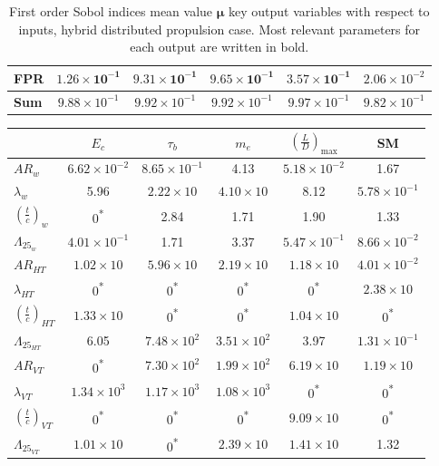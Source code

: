 \begin{table}[!h]
\begin{tabular}{l c c c c c}
		FPR  & $\mathbf{1.26\times10^{-1}}$ & $\mathbf{9.31\times10^{-1}}$ & $\mathbf{9.65\times10^{-1}}$ & $\mathbf{3.57\times10^{-1}}$ & $2.06\times10^{-2}$ \\
		\hline
		\textbf{Sum} & $9.88\times10^{-1}$ & $9.92\times10^{-1}$ & $9.92\times10^{-1}$ & $9.97\times10^{-1}$ & $9.82\times10^{-1}$ \\
		\hline
	\end{tabular}
	\caption{First order Sobol indices mean value $\mathbf{\mu}$ key output variables with respect to inputs, hybrid distributed propulsion case. 
		Most relevant parameters for each output are written in bold.}
	\label{tab:hybrid_dep_sens_an_geom_sobol}
\end{table}
\begin{table}[!h]
	\centering
	\begin{tabular}{l c c c c c}
		\hline
		& $E_{c}$ & $\tau_{b}$ & $m_e$ & $\left(\frac{L}{D}\right)_{\max}$ & SM \\
		\hline
		$AR_w$ & $6.62\times10^{-2}$ & $8.65\times10^{-1}$ & 4.13 & $5.18\times10^{-2}$ & 1.67 \\
		$\lambda_{w}$ & 5.96 & $2.22\times10$ & $4.10\times10$ & 8.12 & $5.78\times10^{-1}$ \\
		$\left(\frac{t}{c}\right)_{w}$ & 0\textsuperscript{*} & 2.84 & 1.71 & 1.90 & 1.33 \\
		$\Lambda_{25_{w}}$ & $4.01\times10^{-1}$ & 1.71 & 3.37 & $5.47\times10^{-1}$ & $8.66\times10^{-2}$ \\
		
		$AR_{HT}$ & $1.02\times10$ & $5.96\times10$ & $2.19\times10$ & $1.18\times10$ & $4.01\times10^{-2}$ \\
		$\lambda_{HT}$ & 0\textsuperscript{*} & 0\textsuperscript{*} & 0\textsuperscript{*} & 0\textsuperscript{*} & $2.38\times10$ \\
		$\left(\frac{t}{c}\right)_{HT}$ & $1.33\times10$ & 0\textsuperscript{*} & 0\textsuperscript{*} & $1.04\times10$ & 0\textsuperscript{*} \\
		$\Lambda_{25_{HT}}$ & 6.05 & $7.48\times10^{2}$ & $3.51\times10^{2}$ & 3.97 & $1.31\times10^{-1}$ \\
		
		$AR_{VT}$ & 0\textsuperscript{*} & $7.30\times10^{2}$ & $1.99\times10^{2}$ & $6.19\times10$ & $1.19\times10$ \\
		$\lambda_{VT}$ & $1.34\times10^{3}$ & $1.17\times10^{3}$ & $1.08\times10^{3}$ & 0\textsuperscript{*} & 0\textsuperscript{*} \\
		$\left(\frac{t}{c}\right)_{VT}$ & 0\textsuperscript{*} & 0\textsuperscript{*} & 0\textsuperscript{*} & $9.09\times10$ & 0\textsuperscript{*} \\
		$\Lambda_{25_{VT}}$ & $1.01\times10$ & 0\textsuperscript{*} & $2.39\times10$ & $1.41\times10$ & 1.32 \\
		

\end{tabular}
\end{table}

